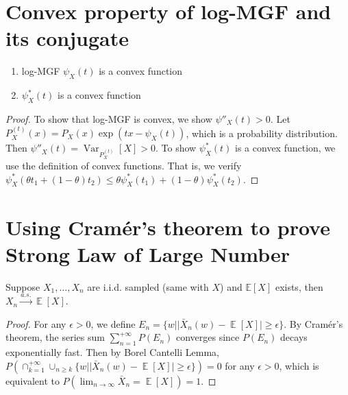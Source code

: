 \documentclass{article}
\DeclareMathOperator{\E}{\mathbb{E}}
\DeclareMathOperator{\Var}{Var}
\begin{document}
\section{Convex property of log-MGF and its conjugate}
\begin{enumerate}
    \item log-MGF $\psi_X(t)$ is a convex function
    \item $\psi^*_X(t)$ is a convex function
\end{enumerate}
\begin{proof}
To show that log-MGF is convex, we show $\psi''_X(t) > 0$.
Let $P_X^{(t)}(x) = P_X(x) \exp(t x - \psi_X(t))$, which is a probability
distribution. Then $\psi''_X(t)=\Var_{P_X^{(t)}}[X]>0$. To show
 $\psi^*_X(t)$ is a convex function, we use the definition of convex
 functions. That is, we verify $\psi_X^*(\theta t_1 + (1-\theta) t_2 ) 
 \leq \theta \psi_X^*(t_1)+(1-\theta) \psi_X^*(t_2)$.
\end{proof}
\section{Using Cramér's theorem to prove Strong Law of Large Number}
Suppose $X_1,\dots, X_n$ are i.i.d. sampled (same with $X$) and $\mathbb{E}[X]$ exists,
then $X_n \xrightarrow{a.s.} \E[X]$.
\begin{proof}
For any $\epsilon>0$, we define $E_n = \{w| |\bar{X}_n(w) - \E[X]|\geq \epsilon \}$. By Cramér's theorem, the series sum $\sum_{n=1}^{+\infty} P(E_n)$
converges since $P(E_n)$ decays exponentially
fast. Then by Borel Cantelli Lemma,
$P(\cap_{k=1}^{+\infty} \cup_{n\geq k} \{w| |\bar{X}_n(w) - \E[X]|\geq \epsilon\}) = 0$ for any
$\epsilon > 0$, which is equivalent to
$P(\lim_{n\to \infty} \bar{X}_n = \E[X]) = 1$.
\end{proof}
\end{document}
